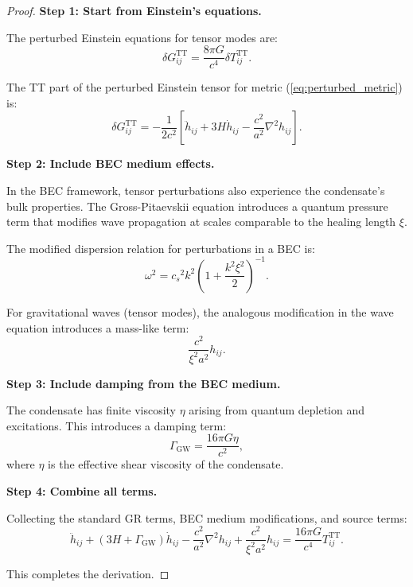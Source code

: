 \documentclass[11pt,a4paper]{article}
\newcommand{\cs}{\ensuremath{c_s}}
\theoremstyle{definition}
\theoremstyle{remark}
\begin{document}
\begin{proof}
\textbf{Step 1: Start from Einstein's equations.}

The perturbed Einstein equations for tensor modes are:
\begin{equation}
\delta G_{ij}^{\mathrm{TT}} = \frac{8\pi G}{c^4}\delta T_{ij}^{\mathrm{TT}}.
\end{equation}

The TT part of the perturbed Einstein tensor for metric (\ref{eq:perturbed_metric}) is:
\begin{equation}
\delta G_{ij}^{\mathrm{TT}} = -\frac{1}{2c^2}\left[\ddot{h}_{ij} + 3H\dot{h}_{ij} - \frac{c^2}{a^2}\nabla^2 h_{ij}\right].
\end{equation}

\textbf{Step 2: Include BEC medium effects.}

In the BEC framework, tensor perturbations also experience the condensate's bulk properties. The Gross-Pitaevskii equation introduces a quantum pressure term that modifies wave propagation at scales comparable to the healing length $\xi$.

The modified dispersion relation for perturbations in a BEC is:
\begin{equation}
\omega^2 = \cs^2 k^2 \left(1 + \frac{k^2\xi^2}{2}\right)^{-1}.
\end{equation}

For gravitational waves (tensor modes), the analogous modification in the wave equation introduces a mass-like term:
\begin{equation}
\frac{c^2}{\xi^2 a^2}h_{ij}.
\end{equation}

\textbf{Step 3: Include damping from the BEC medium.}

The condensate has finite viscosity $\eta$ arising from quantum depletion and excitations. This introduces a damping term:
\begin{equation}
\Gamma_{\mathrm{GW}} = \frac{16\pi G \eta}{c^2},
\end{equation}
where $\eta$ is the effective shear viscosity of the condensate.

\textbf{Step 4: Combine all terms.}

Collecting the standard GR terms, BEC medium modifications, and source terms:
\begin{equation}
\ddot{h}_{ij} + (3H + \Gamma_{\mathrm{GW}})\dot{h}_{ij} - \frac{c^2}{a^2}\nabla^2 h_{ij} + \frac{c^2}{\xi^2 a^2}h_{ij} = \frac{16\pi G}{c^4}T_{ij}^{\mathrm{TT}}.
\end{equation}

This completes the derivation. \qedhere
\end{proof}
\end{document}
